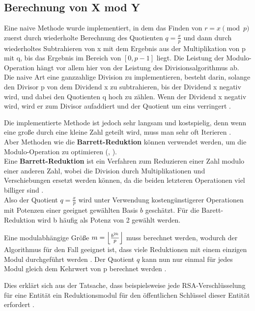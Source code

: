 \subsection{Berechnung von X mod Y}


Eine naive Methode wurde implementiert, in dem das Finden von $ r = x \pmod p $ zuerst
durch wiederholte Berechnung des Quotienten $ q = \frac{x}{p} $ und dann durch
wiederholtes Subtrahieren von x mit dem Ergebnis aus der Multiplikation von p mit q, bis das Ergebnis im Bereich von $ [0, p - 1] $ liegt.
Die Leistung der Modulo-Operation hängt vor allem hier von der Leistung des Divisionsalgorithmus ab. \\

Die naive Art eine ganzzahlige Division zu implementieren, besteht darin,
solange den Divisor p von dem Dividend x zu subtrahieren, bis der Dividend x negativ wird, und dabei den Quotienten q hoch zu zählen. Wenn der Dividend x negativ wird, wird er zum Divisor aufaddiert und der Quotient um eins verringert \cite{bericht}. 

Die implementierte Methode ist jedoch sehr langsam und kostspielig, denn wenn eine große durch eine kleine Zahl geteilt wird, muss man sehr oft Iterieren 
\cite{barett}. \\

Aber Methoden wie die \textbf{Barrett-Reduktion} können verwendet werden, um die Modulo-Operation zu optimieren (\cite{anoops}, \cite{hasenplaugh}).\\

Eine \textbf{Barrett-Reduktion} ist ein Verfahren zum Reduzieren einer Zahl modulo einer anderen Zahl, wobei die Division durch Multiplikationen und Verschiebungen ersetzt werden können, da die beiden letzteren Operationen viel billiger sind \cite{patent}.\\
Also der Quotient  $ q = \frac{x}{p} $ wird unter Verwendung kostengünstigerer Operationen mit Potenzen einer geeignet gewählten Basis $ b $ geschätzt. Für die Barett-Reduktion wird b häufig als Potenz von 2 gewählt werden.

Eine modulabhängige Größe $ m = \floor*{\frac{b^{2k}}{p}} $ muss berechnet werden, wodurch der Algorithmus für den Fall geeignet ist, dass viele Reduktionen mit einem einzigen Modul durchgeführt werden \cite{Hankerson}. Der Quotient $ q $ kann nun nur einmal für jedes Modul gleich dem Kehrwert von p berechnet werden \cite{barett}.

Dies erklärt sich aus der Tatsache, dass beispielsweise jede RSA-Verschlüsselung für eine Entität ein Reduktionsmodul für den öffentlichen Schlüssel dieser Entität erfordert \cite{menezes:1997}. \\


